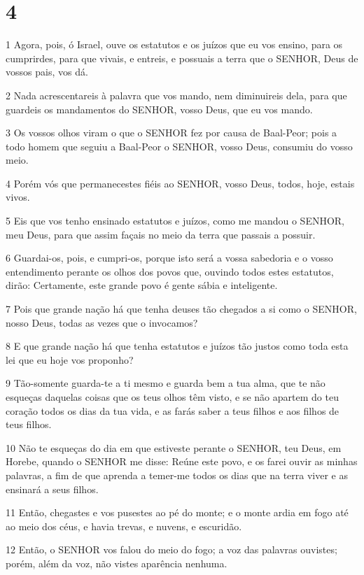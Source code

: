 \chapter{4}

\par 1 Agora, pois, ó Israel, ouve os estatutos e os juízos que eu vos ensino, para os cumprirdes, para que vivais, e entreis, e possuais a terra que o SENHOR, Deus de vossos pais, vos dá.
\par 2 Nada acrescentareis à palavra que vos mando, nem diminuireis dela, para que guardeis os mandamentos do SENHOR, vosso Deus, que eu vos mando.
\par 3 Os vossos olhos viram o que o SENHOR fez por causa de Baal-Peor; pois a todo homem que seguiu a Baal-Peor o SENHOR, vosso Deus, consumiu do vosso meio.
\par 4 Porém vós que permanecestes fiéis ao SENHOR, vosso Deus, todos, hoje, estais vivos.
\par 5 Eis que vos tenho ensinado estatutos e juízos, como me mandou o SENHOR, meu Deus, para que assim façais no meio da terra que passais a possuir.
\par 6 Guardai-os, pois, e cumpri-os, porque isto será a vossa sabedoria e o vosso entendimento perante os olhos dos povos que, ouvindo todos estes estatutos, dirão: Certamente, este grande povo é gente sábia e inteligente.
\par 7 Pois que grande nação há que tenha deuses tão chegados a si como o SENHOR, nosso Deus, todas as vezes que o invocamos?
\par 8 E que grande nação há que tenha estatutos e juízos tão justos como toda esta lei que eu hoje vos proponho?
\par 9 Tão-somente guarda-te a ti mesmo e guarda bem a tua alma, que te não esqueças daquelas coisas que os teus olhos têm visto, e se não apartem do teu coração todos os dias da tua vida, e as farás saber a teus filhos e aos filhos de teus filhos.
\par 10 Não te esqueças do dia em que estiveste perante o SENHOR, teu Deus, em Horebe, quando o SENHOR me disse: Reúne este povo, e os farei ouvir as minhas palavras, a fim de que aprenda a temer-me todos os dias que na terra viver e as ensinará a seus filhos.
\par 11 Então, chegastes e vos pusestes ao pé do monte; e o monte ardia em fogo até ao meio dos céus, e havia trevas, e nuvens, e escuridão.
\par 12 Então, o SENHOR vos falou do meio do fogo; a voz das palavras ouvistes; porém, além da voz, não vistes aparência nenhuma.
